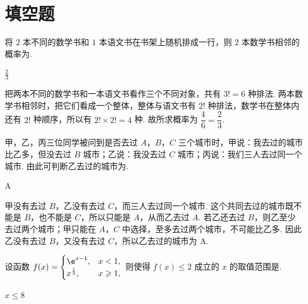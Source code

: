 \section{填空题}

\begin{problem}
将 \(2\) 本不同的数学书和 \(1\) 本语文书在书架上随机排成一行，则 \(2\) 本数学书相邻的概率为\fillinblank{}.
\end{problem}

\begin{answer}
\(\frac{2}{3}\)
\end{answer}

\begin{solution}
把两本不同的数学书和一本语文书看作三个不同对象，共有 \(3!=6\) 种排法. 两本数学书相邻时，把它们看成一个整体，整体与语文书有 \(2!\) 种排法，数学书在整体内还有 \(2!\) 种顺序，所以有 \(2!\times2!=4\) 种. 故所求概率为 \(\dfrac{4}{6}=\dfrac{2}{3}\).
\end{solution}

\begin{problem}
甲，乙，丙三位同学被问到是否去过 \(A\)，\(B\)，\(C\) 三个城市时，甲说：我去过的城市比乙多，但没去过 \(B\) 城市；乙说：我没去过 \(C\) 城市；丙说：我们三人去过同一个城市. 由此可判断乙去过的城市为\fillinblank{}.
\end{problem}

\begin{answer}
A
\end{answer}

\begin{solution}
甲没有去过 \(B\)，乙没有去过 \(C\)，而三人去过同一个城市. 这个共同去过的城市既不能是 \(B\)，也不能是 \(C\)，所以只能是 \(A\)，从而乙去过 \(A\). 若乙还去过 \(B\)，则乙至少去过两个城市；甲只能在 \(A\)，\(C\) 中选择，至多去过两个城市，不可能比乙多. 因此乙没有去过 \(B\)，又没有去过 \(C\)，所以乙去过的城市为 A.
\end{solution}

\begin{problem}
设函数 \( f(x) = \begin{cases}
\e^{x - 1}, & x < 1,\\
x^{\frac{1}{3}}, & x \geqslant 1,
\end{cases} \) 则使得 \( f(x) \leqslant 2 \) 成立的 \( x \) 的取值范围是\fillinblank{}.
\end{problem}

\begin{answer}
\(x \leqslant 8\)
\end{answer}

